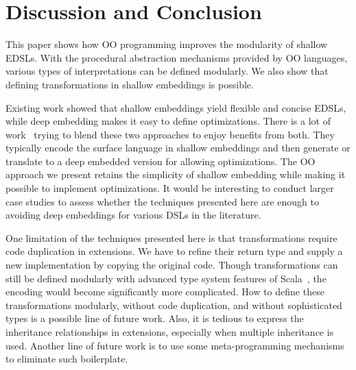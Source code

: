 \section{Discussion and Conclusion}
This paper shows how OO programming improves the modularity of shallow EDSLs.
With the procedural abstraction mechanisms provided by OO languages, various types of
interpretations can be defined modularly. We also show that defining
transformations in shallow embeddings is possible.


Existing work showed that shallow embeddings yield flexible and concise EDSLs, while deep embedding makes
it easy to define optimizations.
There is a lot of work~\cite{svenningsson2012combining,
  Jovanovic:2014:YCD:2658761.2658771, scherr2014implicit} trying to blend these two
approaches to enjoy benefits from both.
They typically encode the surface language in shallow embeddings and
then generate or translate to a deep embedded version for allowing optimizations.
The OO approach we present retains the simplicity of shallow embedding while
making it possible to implement optimizations. It would be interesting
to conduct larger case studies to assess whether the techniques
presented here are enough to avoiding deep embeddings for various DSLs
in the literature.

One limitation of the techniques presented here is that
transformations require code duplication in extensions.
We have to refine their return type and
supply a new implementation by copying the original code.
Though transformations can still be defined modularly with advanced type
system features of Scala~\cite{zenger05independentlyextensible},
the encoding would become significantly more complicated.
How to define these transformations modularly, without code
duplication, and without sophisticated types
is a possible line of future work.  Also, it is tedious to
express the inheritance relationships in extensions, especially when
multiple inheritance is used. Another line of future work is to use
some meta-programming mechanisms to eliminate such boilerplate.
